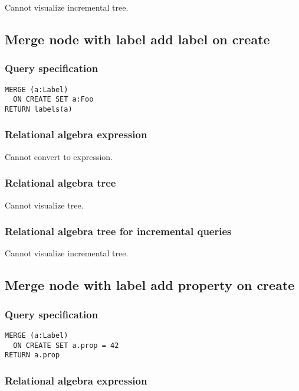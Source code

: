 Cannot visualize incremental tree.

\subsection{Merge node with label add label on create}

\subsubsection*{Query specification}

\begin{lstlisting}
MERGE (a:Label)
  ON CREATE SET a:Foo
RETURN labels(a)
\end{lstlisting}

\subsubsection*{Relational algebra expression}

Cannot convert to expression.

\subsubsection*{Relational algebra tree}

Cannot visualize tree.

\subsubsection*{Relational algebra tree for incremental queries}

Cannot visualize incremental tree.

\subsection{Merge node with label add property on create}

\subsubsection*{Query specification}

\begin{lstlisting}
MERGE (a:Label)
  ON CREATE SET a.prop = 42
RETURN a.prop
\end{lstlisting}

\subsubsection*{Relational algebra expression}

